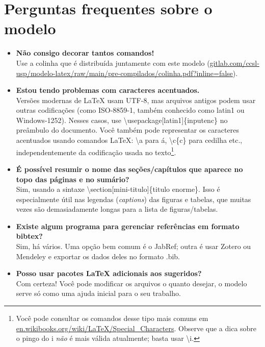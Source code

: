 
\chapter{Perguntas frequentes sobre o modelo}

\begin{itemize}

\item \textbf{Não consigo decorar tantos comandos!}\\
Use a colinha que é distribuída juntamente com este modelo (\url{gitlab.com/ccsl-usp/modelo-latex/raw/main/pre-compilados/colinha.pdf?inline=false}).

\item \textbf{Estou tendo problemas com caracteres acentuados.}\\
Versões modernas de \LaTeX{} usam UTF-8, mas arquivos antigos podem usar outras codificações (como ISO-8859-1, também conhecido como latin1 ou Windows-1252). Nesses casos, use \textsf{\textbackslash{}usepackage[latin1]\{inputenc\}} no preâmbulo do documento. Você também pode representar os caracteres acentuados usando comandos \LaTeX{}: \textsf{\textbackslash\textquotesingle{}a} para á, \textsf{\textbackslash{}c\{c\}} para cedilha etc., independentemente da codificação usada no texto\footnote{Você pode consultar os comandos desse tipo mais comuns em \url{en.wikibooks.org/wiki/LaTeX/Special_Characters}. Observe que a dica sobre o pingo do i \emph{não} é mais válida atualmente; basta usar \textsf{\textbackslash\textquotesingle{}i}.}.

\item \textbf{É possível resumir o nome das seções/capítulos que aparece no topo das páginas e no sumário?}\\
Sim, usando a sintaxe \textsf{\textbackslash{}section[mini-titulo]\{titulo enorme\}}. Isso é especialmente útil nas legendas (\textit{captions}) das figuras e tabelas, que muitas vezes são demasiadamente longas para a lista de figuras/tabelas.

\item \textbf{Existe algum programa para gerenciar referências em formato bibtex?}\\
Sim, há vários. Uma opção bem comum é o JabRef; outra é usar Zotero ou Mendeley e exportar os dados deles no formato .bib.

\item \textbf{Posso usar pacotes \LaTeX{} adicionais aos sugeridos?}\\
Com certeza! Você pode modificar os arquivos o quanto desejar, o modelo serve só como uma ajuda inicial para o seu trabalho.

\end{itemize}
